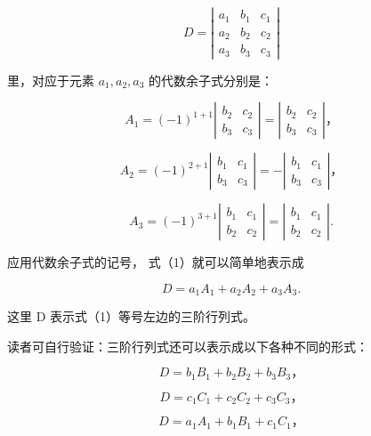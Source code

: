 \[
D=\left|\begin{array}{ccc}a_1&b_1&c_1\\a_2&b_2&c_2\\a_3&b_3&c_3\end{array}\right|
\]

里，对应于元素 \(a_1, a_2, a_3\) 的代数余子式分别是：

\[
A _ {1} = (- 1) ^ {1 + 1} \left| \begin{array}{ll} b _ {2} & c _ {2} \\ b _ {3} & c _ {3} \end{array} \right| = \left| \begin{array}{ll} b _ {2} & c _ {2} \\ b _ {3} & c _ {3} \end{array} \right|\text{，}
\]

\[
A _ {2} = (- 1) ^ {2 + 1} \left| \begin{array}{ll} b _ {1} & c _ {1} \\ b _ {3} & c _ {3} \end{array} \right| = - \left| \begin{array}{ll} b _ {1} & c _ {1} \\ b _ {3} & c _ {3} \end{array} \right|\text{，}
\]

\[
A _ {3} = (- 1) ^ {3 + 1} \left| \begin{array}{ll} b _ {1} & c _ {1} \\ b _ {2} & c _ {2} \end{array} \right| = \left| \begin{array}{ll} b _ {1} & c _ {1} \\ b _ {2} & c _ {2} \end{array} \right|.
\]

应用代数余子式的记号， 式（1）就可以简单地表示成

\[
D = a _ {1} A _ {1} + a _ {2} A _ {2} + a _ {3} A _ {3}. \tag{1′}
\]

这里 D 表示式（1）等号左边的三阶行列式。

读者可自行验证：三阶行列式还可以表示成以下各种不同的形式：

\[
D = b _ {1} B _ {1} + b _ {2} B _ {2} + b _ {3} B _ {3}\text{，} \tag {2}
\]

\[
D = c _ {1} C _ {1} + c _ {2} C _ {2} + c _ {3} C _ {3}\text{，} \tag {3}
\]

\[
D = a _ {1} A _ {1} + b _ {1} B _ {1} + c _ {1} C _ {1}\text{，} \tag {4}
\]

